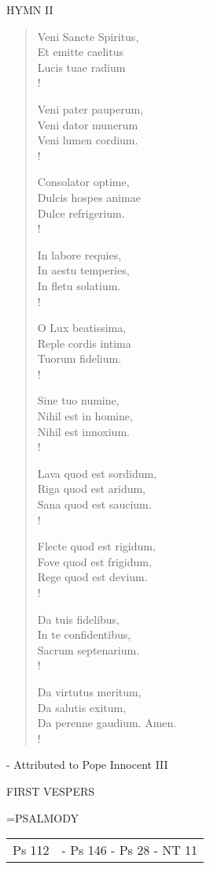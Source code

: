\noindent\small{\uppercase{Hymn II}}\normalsize
\begin{verse}
Veni Sancte Spiritus,\\
Et emitte caelitus\\
Lucis tuae radium\\!

Veni pater pauperum,\\
Veni dator munerum\\
Veni lumen cordium.\\!

Consolator optime,\\
Dulcis hospes animae\\
Dulce refrigerium.\\!

In labore requies,\\
In aestu temperies,\\
In fletu solatium.\\!

O Lux beatissima,\\
Reple cordis intima\\
Tuorum fidelium.\\!

Sine tuo numine,\\
Nihil est in homine,\\
Nihil est innoxium.\\!

Lava quod est sordidum,\\
Riga quod est aridum,\\
Sana quod est saucium.\\!

Flecte quod est rigidum,\\
Fove quod est frigidum,\\
Rege quod est devium.\\!

Da tuis fidelibus,\\
In te confidentibus,\\
Sacrum septenarium.\\!

Da virtutus meritum,\\
Da salutis exitum,\\
Da perenne gaudium. Amen.\\!
\end{verse}
- Attributed to Pope Innocent III

\begin{flushleft}\normalsize FIRST VESPERS\\\end{flushleft}
\hangindent=\parindent \small{PSALMODY}
\begin{center}
\begin{tabular}{ l l }
Ps 112 &  - Ps 146 - Ps 28 - NT 11\\
\end{tabular}
\end{center}		

